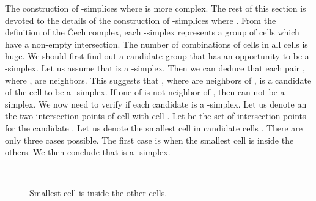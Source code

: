 \documentclass[conference]{IEEEtran}
\begin{document}
The construction of -simplices where  is more complex. The rest of this section is devoted to the details of the construction of -simplices where . From the definition of the \v{C}ech complex, each -simplex represents a group of  cells which have a non-empty intersection. The number of combinations of  cells in all  cells is huge. We should first find out a candidate group that has an opportunity to be a -simplex. Let us assume that  is a -simplex. Then we can deduce that each pair , where , are neighbors. This suggests that , where  are neighbors of , is a candidate of the cell  to be a -simplex. If one of  is not neighbor of , then  can not be a -simplex. We now need to verify if each candidate is a -simplex. Let us denote  an  the two intersection points of cell  with cell . Let  be the set of intersection points for the candidate . Let us denote  the smallest cell in candidate cells .
There are only three cases possible. The first case is when the smallest cell  is inside the others. We then conclude that  is a -simplex.

\begin{figure}[H]
\centering
{}	
\hfil\\
\caption{Smallest cell is inside the other cells.}
	\label{fig:smallest_inside}
\end{figure}
\end{document}
